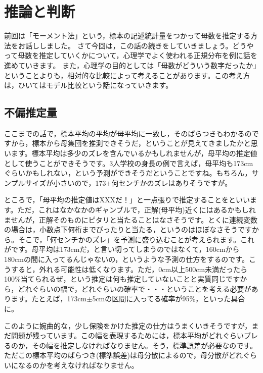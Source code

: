 \documentclass{ltjsbook}
\begin{document}
\chapter{推論と判断}
\label{m17_estimation_and_test}
前回は「モーメント法」という，標本の記述統計量をつかって母数を推定する方法をお話ししました。
さて今回は，この話の続きをしていきましょう。どうやって母数を推定していくかについて，心理学でよく使われる正規分布を例に話を進めていきます。
また，心理学の目的としては「母数がどういう数字だったか」ということよりも，相対的な比較によって考えることがあります。この考え方は，ひいてはモデル比較という話になっていきます。

\section{不偏推定量}
ここまでの話で，標本平均の平均が母平均に一致し，そのばらつきもわかるのですから，標本から母集団を推測できそうだ，ということが見えてきましたかと思います。標本平均は多少のズレを含んでいるかもしれませんが，母平均の推定値として使うことができそうです。3人学校の身長の例で言えば，母平均も173cmぐらいかもしれない，という予測ができそうだということですね。もちろん，サンプルサイズが小さいので，173$\pm$何センチかのズレはありそうですが。

ところで，「母平均の推定値はXXXだ！」と一点張りで推定することをといいます。ただ，これはなかなかのギャンブルで，正解(母平均)近くにはあるかもしれませんが，正解そのものにピタリと当たることはなさそうです。とくに連続変数の場合は，小数点下何桁までぴったりと当たる，というのはほぼなさそうですから。そこで，「何センチかのズレ」を予測に盛り込むことが考えられます。これがです。母平均は173cmだ，と言い切ってしまうのではなくて，160cmから180cmの間に入ってるんじゃないの，というような予測の仕方をするのです。こうすると，外れる可能性は低くなります。ただ，0cm以上500cm未満だったら100\%当てられるぜ，という推定は何も推定していないことと実質同じですから，どれぐらいの幅で，どれぐらいの確率で・・・ということを考える必要があります。たとえば，173cm$\pm$5cmの区間に入ってる確率が95\%，といった具合に。

このように婉曲的な，少し保険をかけた推定の仕方はうまくいきそうですが，まだ問題が残っています。この幅を表現するためには，標本平均がどれぐらいブレるのか，その幅を推定しなければなりません。そう，標準誤差が必要なのです。ただこの標本平均のばらつき(標準誤差)は母分散によるので，母分散がどれぐらいになるのかを考えなければなりません。
\end{document}
